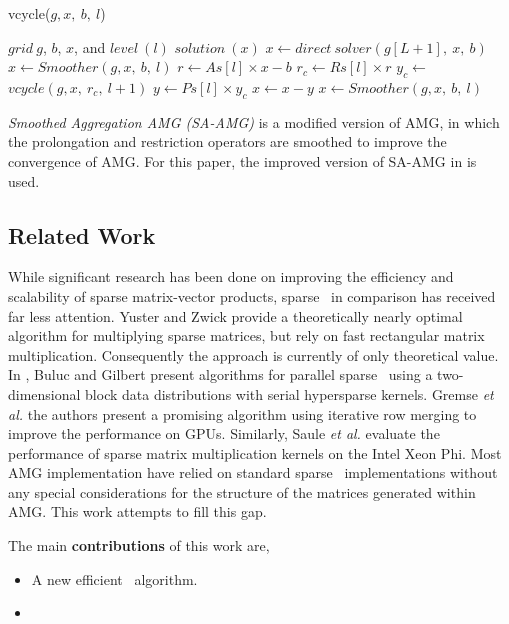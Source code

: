 \begin{algorithm}[ht] 
  \caption{vcycle($g, x,\ b,\ l$)} \label{alg:vcycle} 
  \begin{algorithmic}[1]
    \Require $grid\ g$, $b$, $x$, and $level\ (l)$
    \Ensure  $solution\ (x)$
      \State $x \leftarrow direct\ solver(g[L+1],\ x,\ b)$
    \Else
      \State $x \leftarrow Smoother(g, x,\ b,\ l)$
      \State $r \leftarrow As[l] \times x - b$
      \State $r_c \leftarrow Rs[l] \times r$
      \State $y_c \leftarrow$ $vcycle(g, x,\ r_c,\ l+1)$
      \State $y \leftarrow Ps[l] \times y_c$
      \State $x \leftarrow x - y$
      \State $x \leftarrow Smoother(g, x,\ b,\ l)$
    \EndIf
  \end{algorithmic}
\end{algorithm}

\textit{Smoothed Aggregation AMG (SA-AMG)}\cite{Vanek:1995} is a modified version of AMG,
in which the prolongation and restriction operators are smoothed %
to improve the convergence of AMG.
For this paper, the improved version of SA-AMG in \cite{treister2015non} is used.


\subsection{Related Work}

While significant research has been done on improving the efficiency and scalability of sparse matrix-vector products, sparse \mm\ in comparison has received far less attention. Yuster and Zwick \cite{Yuster2005} provide a theoretically nearly optimal algorithm for multiplying sparse matrices, but rely on fast rectangular matrix multiplication. Consequently the approach is currently of only theoretical value. In \cite{Buluc12}, Buluc and Gilbert present algorithms for parallel sparse \mm\ using a two-dimensional block data distributions with serial hypersparse kernels. 
Gremse {\em et al.} \cite{Gremse15} the authors present a promising algorithm using iterative row merging to improve the performance on GPUs. Similarly, Saule {\em et al.} \cite{Saule14} evaluate the performance of sparse matrix multiplication kernels on the Intel Xeon Phi. Most AMG implementation have relied on standard sparse \mm\ implementations without any special considerations for the structure of the matrices generated within AMG. This work attempts to fill this gap. 

The main {\bf contributions} of this work are,
\begin{itemize}
  \item A new efficient \mm\ algorithm.
  \item {}
\end{itemize}

